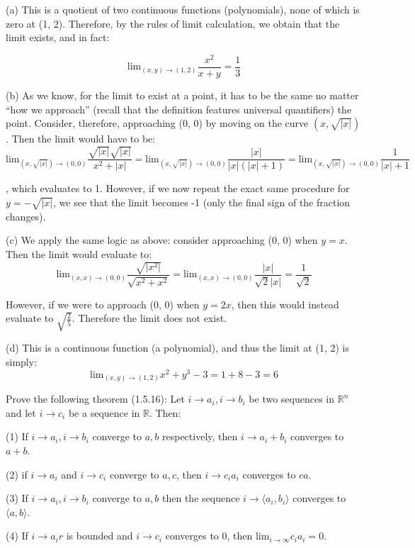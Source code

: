 \begin{solution}

    (a) This is a quotient of two continuous functions (polynomials), none of which is zero at (1, 2). Therefore, by the rules of limit calculation, we obtain that the limit exists, and in fact:

    $$\text{lim}_{(x, y) \rightarrow (1, 2)} \frac{x^2}{x + y} = \frac{1}{3}$$

    (b) As we know, for the limit to exist at a point, it has to be the same no matter ``how we approach'' (recall that the definition features universal quantifiers) the point. Consider, therefore, approaching (0, 0) by moving on the curve $(x, \sqrt{\lvert x \rvert})$. Then the limit would have to be:
    $$\text{lim}_{(x, \sqrt{\lvert x \rvert}) \rightarrow (0, 0)} \frac{\sqrt{\lvert x \rvert}\sqrt{\lvert x \rvert}}{x^2 + \lvert x \rvert} = \text{lim}_{(x, \sqrt{\lvert x \rvert}) \rightarrow (0, 0)} \frac{\lvert x \rvert}{\lvert x \rvert(\lvert x \rvert + 1)} = \text{lim}_{(x, \sqrt{\lvert x \rvert}) \rightarrow (0, 0)} \frac{1}{\lvert x \rvert + 1}$$

    , which evaluates to 1. However, if we now repeat the exact same procedure for $y = -\sqrt{\lvert x \rvert}$, we see that the limit becomes -1 (only the final sign of the fraction changes).

    (c) We apply the same logic as above: consider approaching (0, 0) when $y=x$. Then the limit would evaluate to:
    $$\text{lim}_{(x, x) \rightarrow (0,0)}\frac{\sqrt{\lvert x^2 \rvert}}{\sqrt{x^2+x^2}} = \text{lim}_{(x, x)\rightarrow(0, 0)}\frac{\lvert x \rvert}{\sqrt{2}\lvert x \rvert} = \frac{1}{\sqrt{2}}$$

    However, if we were to approach (0, 0) when $y=2x$, then this would instead evaluate to $\sqrt{\frac{2}{5}}$. Therefore the limit does not exist.

    (d) This is a continuous function (a polynomial), and thus the limit at (1, 2) is simply:
    $$\text{lim}_{(x, y) \rightarrow (1, 2)} x^2 + y^3 - 3 = 1 + 8 - 3 = 6$$
\end{solution}

\begin{exercise}{17}
    Prove the following theorem (1.5.16): Let $i \rightarrow a_i, i \rightarrow b_i$ be two sequences in $\mathbb{R}^n$ and let $i \rightarrow c_i$ be a sequence in $\mathbb{R}$. Then:

    (1) If $i \rightarrow a_i, i \rightarrow b_i$ converge to $a, b$ respectively, then $i \rightarrow a_i + b_i$ converges to $a+b$.

    (2) if $i \rightarrow a_i$ and $i \rightarrow c_i$ converge to $a, c$, then $i \rightarrow c_i a_i$ converges to $ca$.

    (3) If $i \rightarrow a_i, i \rightarrow b_i$ converge to $a, b$ then the sequence $i \rightarrow \langle a_i, b_i \rangle$ converges to $\langle a, b\rangle$.

    (4) If $i\rightarrow a_ir$ is bounded and $i \rightarrow c_i$ converges to 0, then $\text{lim}_{i \rightarrow \infty} c_ia_i = 0$.
\end{exercise}

